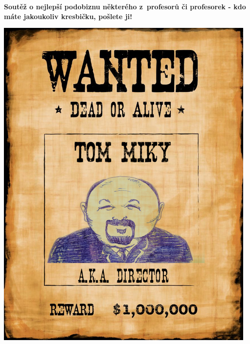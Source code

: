 \documentclass[twoside, 11pt]{article}
\begin{document}
\begin{center}
    \Large \textbf{Soutěž o nejlepší podobiznu některého z~profesorů či profesorek - kdo máte jakoukoliv kresbičku, pošlete ji!}
\end{center}
\centering
\includegraphics[width=0.97\textwidth]{wanted}

\end{document}
